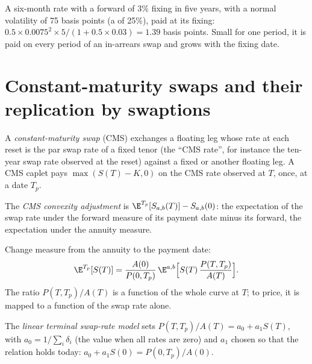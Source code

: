 \begin{example}\label{ex:rc:convexity-adjustments-and-constant-maturity-products:timing}
A six-month rate with a forward of 3\% fixing in five years, with a normal
volatility of 75 basis points (a  of 25\%), paid at its
fixing: $0.5\times0.0075^2\times5/(1+0.5\times0.03) = 1.39$ basis points. Small
for one period, it is paid on every period of an in-arrears swap and grows
with the fixing date.
\end{example}

\section{Constant-maturity swaps and their replication by swaptions}

\begin{definition}\label{def:rc:convexity-adjustments-and-constant-maturity-products:cms}
A \emph{constant-maturity swap} (CMS) exchanges
a floating leg whose rate at each reset is the par swap rate of a fixed tenor
(the ``CMS rate'', for instance the ten-year swap rate observed at the reset)
against a fixed or another floating leg. A CMS caplet pays
$\max(S(T)-K,0)$ on the CMS rate observed at $T$, once, at a date $T_p$.
\end{definition}

\begin{definition}\label{def:rc:convexity-adjustments-and-constant-maturity-products:cmsadj}
The \emph{CMS convexity adjustment} is
$\E^{T_p}[S_{a,b}(T)]-S_{a,b}(0)$: the expectation of the swap rate under the
forward measure of its payment date minus its forward, the expectation under
the annuity measure.
\end{definition}

Change measure from the annuity to the payment date:
\[
\E^{T_p}[S(T)] = \frac{A(0)}{P(0,T_p)}\,\E^{a,b}\Bigl[S(T)\,\frac{P(T,T_p)}{A(T)}\Bigr].
\]
The ratio $P(T,T_p)/A(T)$ is a function of the whole curve at $T$; to price, it
is mapped to a function of the swap rate alone.

\begin{definition}\label{def:rc:convexity-adjustments-and-constant-maturity-products:tsr}
The \emph{linear terminal swap-rate model}
sets $P(T,T_p)/A(T) = a_0 + a_1S(T)$, with $a_0 = 1/\sum_i\delta_i$ (the value when
all rates are zero) and $a_1$ chosen so that the relation holds today:
$a_0+a_1S(0) = P(0,T_p)/A(0)$.
\end{definition}

